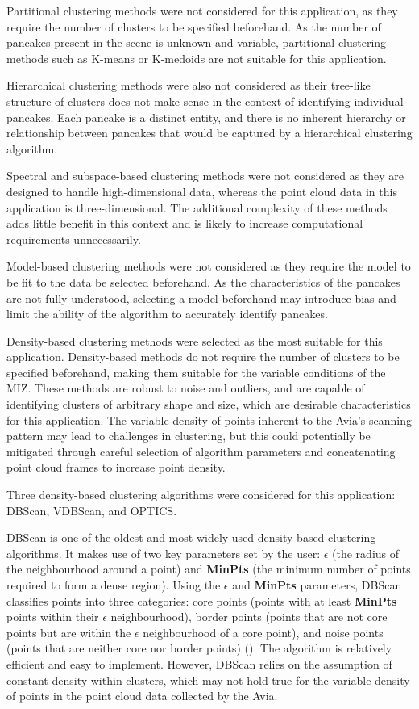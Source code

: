 Partitional clustering methods were not considered for this application, as they require the number of clusters to be specified beforehand. As the number of pancakes present in the scene is unknown and variable, partitional clustering methods such as K-means or K-medoids are not suitable for this application.

Hierarchical clustering methods were also not considered as their tree-like structure of clusters does not make sense in the context of identifying individual pancakes. Each pancake is a distinct entity, and there is no inherent hierarchy or relationship between pancakes that would be captured by a hierarchical clustering algorithm.

Spectral and subspace-based clustering methods were not considered as they are designed to handle high-dimensional data, whereas the point cloud data in this application is three-dimensional. The additional complexity of these methods adds little benefit in this context and is likely to increase computational requirements unnecessarily.

Model-based clustering methods were not considered as they require the model to be fit to the data be selected beforehand. As the characteristics of the pancakes are not fully understood, selecting a model beforehand may introduce bias and limit the ability of the algorithm to accurately identify pancakes.

Density-based clustering methods were selected as the most suitable for this application. Density-based methods do not require the number of clusters to be specified beforehand, making them suitable for the variable conditions of the \ac{MIZ}. These methods are robust to noise and outliers, and are capable of identifying clusters of arbitrary shape and size, which are desirable characteristics for this application. The variable density of points inherent to the Avia's scanning pattern may lead to challenges in clustering, but this could potentially be mitigated through careful selection of algorithm parameters and concatenating point cloud frames to increase point density.

Three density-based clustering algorithms were considered for this application: \ac{DBScan}, \ac{VDBScan}, and \ac{OPTICS}.

\ac{DBScan} is one of the oldest and most widely used density-based clustering algorithms. It makes use of two key parameters set by the user: \textbf{$\epsilon$} (the radius of the neighbourhood around a point) and \textbf{MinPts} (the minimum number of points required to form a dense region). Using the \textbf{$\epsilon$} and \textbf{MinPts} parameters, \ac{DBScan} classifies points into three categories: core points (points with at least \textbf{MinPts} points within their \textbf{$\epsilon$} neighbourhood), border points (points that are not core points but are within the \textbf{$\epsilon$} neighbourhood of a core point), and noise points (points that are neither core nor border points) (\cite{esterDensityBasedAlgorithmDiscovering1996}). The algorithm is relatively efficient and easy to implement. However, \ac{DBScan} relies on the assumption of constant density within clusters, which may not hold true for the variable density of points in the point cloud data collected by the Avia.

